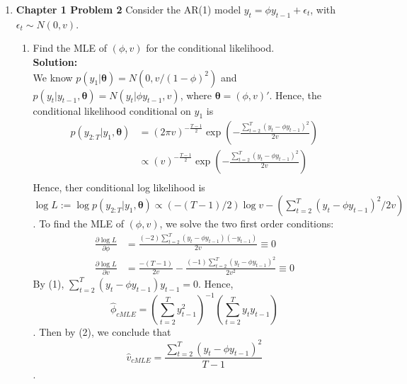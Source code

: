 \documentclass[12pt]{article}\usepackage[]{graphicx}\usepackage[]{color}
\newcommand{\bstheta}{\boldsymbol{\theta}}
\begin{document}
\begin{enumerate}
\item \textbf{Chapter 1 Problem 2} Consider the AR(1) model $y_t = \phi y_{t-1} + \epsilon _t$, with $\epsilon _t \sim N(0, v)$.
\begin{enumerate}
	\item Find the MLE of $(\phi, v)$ for the conditional likelihood.\\
	\textbf{Solution:}\\
	We know $p(y_1|\bstheta) = N(0, v/(1-\phi)^2)$ and $p(y_t|y_{t-1}, \bstheta) = N(y_t|\phi y_{t-1}, v)$, where $\bstheta = (\phi, v)'$. Hence, the conditional likelihood conditional on $y_1$ is
	\begin{align*}
		p(y_{2:T}|y_1, \bstheta) &= (2 \pi v)^{-\frac{T-1}{2}} \exp \left(-\frac{\sum _{t=2}^T (y_t- \phi y_{t-1})^2}{2v} \right)\\
		&\propto (v)^{-\frac{T-1}{2}} \exp \left(-\frac{\sum _{t=2}^T (y_t- \phi y_{t-1})^2}{2v} \right)\\
	\end{align*}
	Hence, ther conditional log likelihood is $\log L := \log p(y_{2:T}|y_1, \boldsymbol{\theta}) \propto (-(T-1)/2) \log v - (\sum _{t=2}^T(y_t- \phi y_{t-1})^2/2v)$.
	To find the MLE of $(\phi, v)$, we solve the two first order conditions:
	\begin{align}
		\frac{\partial \log L}{\partial \phi} &= \frac{(-2)\sum _{t=2}^T(y_t- \phi y_{t-1})(-y_{t-1})}{2v} \equiv 0\\  
		\frac{\partial \log L}{\partial v} &= \frac{-(T-1)}{2v} -\frac{(-1)\sum _{t=2}^T (y_t- \phi y_{t-1})^2}{2v^2} \equiv 0
	\end{align}
	By (1), $\sum _{t=2}^T(y_t- \phi y_{t-1})y_{t-1} = 0$. Hence, $$\hat{\phi}_{cMLE} = \left(\sum_{t=2}^T y_{t-1}^2\right)^{-1}\left(\sum_{t=2}^Ty_ty_{t-1}\right)$$.
	Then by (2), we conclude that $$\hat{v}_{cMLE} = \frac{\sum _{t=2}^T (y_t- \phi y_{t-1})^2}{T-1}$$.
	

\end{enumerate}
\end{enumerate}
\end{document}
